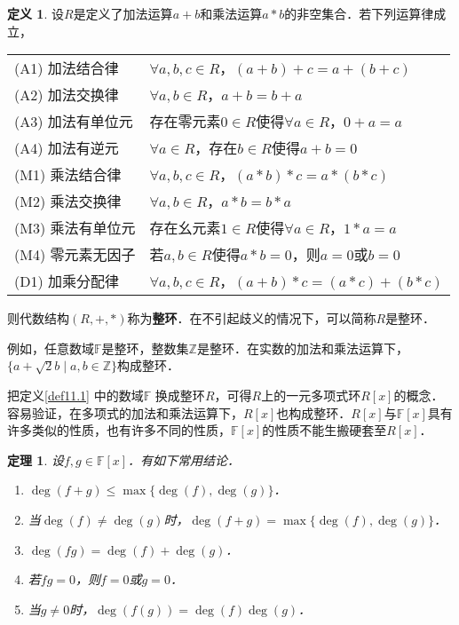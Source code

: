 \documentclass[a4paper,fontset=windows]{ctexbook}
\newtheorem{theorem}{定理}[chapter]
\theoremstyle{definition}
\newtheorem{definition}{定义}[chapter]
\renewcommand{\le}{\leqslant}
\begin{document}
\begin{definition}\label{def11.2}
设$R$是定义了加法运算$a+b$和乘法运算$a*b$的非空集合．若下列运算律成立，
\begin{center}\begin{tabular}{ll}
(A1) 加法结合律 & $\forall a,b,c\in R$，$(a+b)+c=a+(b+c)$ \\
(A2) 加法交换律 & $\forall a,b\in R$，$a+b=b+a$ \\
(A3) 加法有单位元 & 存在零元素$0\in R$使得$\forall a\in R$，$0+a=a$ \\
(A4) 加法有逆元 & $\forall a\in R$，存在$b\in R$使得$a+b=0$  \\
(M1) 乘法结合律 & $\forall a,b,c\in R$，$(a*b)*c=a*(b*c)$ \\
(M2) 乘法交换律 & $\forall a,b\in R$，$a*b=b*a$ \\
(M3) 乘法有单位元 & 存在幺元素$1\in R$使得$\forall a\in R$，$1*a=a$ \\
(M4) 零元素无因子 & 若$a,b\in R$使得$a*b=0$，则$a=0$或$b=0$ \\
(D1) 加乘分配律 & $\forall a,b,c\in R$，$(a+b)*c=(a*c)+(b*c)$
\end{tabular}\end{center}
则代数结构$(R,+,*)$称为{\bf 整环}．在不引起歧义的情况下，可以简称$R$是整环．
\end{definition}

例如，任意数域$\mathbb{F}$是整环，整数集$\mathbb{Z}$是整环．在实数的加法和乘法运算下，$\{a+\sqrt{2}b\mid a,b\in\mathbb{Z}\}$构成整环．

把定义\ref{def11.1} 中的数域$\mathbb{F}$ 换成整环$R$，可得$R$上的一元多项式环$R[x]$的概念．容易验证，在多项式的加法和乘法运算下，$R[x]$也构成整环．$R[x]$与$\mathbb{F}[x]$具有许多类似的性质，也有许多不同的性质，$\mathbb{F}[x]$的性质不能生搬硬套至$R[x]$．

\begin{theorem}\label{thm11.1}
设$f,g\in\mathbb{F}[x]$．有如下常用结论．
\begin{enumerate}
\item $\deg(f+g)\le\max\{\deg(f),\deg(g)\}$．
\item 当$\deg(f)\ne\deg(g)$时，$\deg(f+g)=\max\{\deg(f),\deg(g)\}$．
\item $\deg(fg)=\deg(f)+\deg(g)$．
\item 若$fg=0$，则$f=0$或$g=0$．
\item 当$g\ne 0$时，$\deg(f(g))=\deg(f)\deg(g)$．
\end{enumerate}
\end{theorem}
\end{document}
